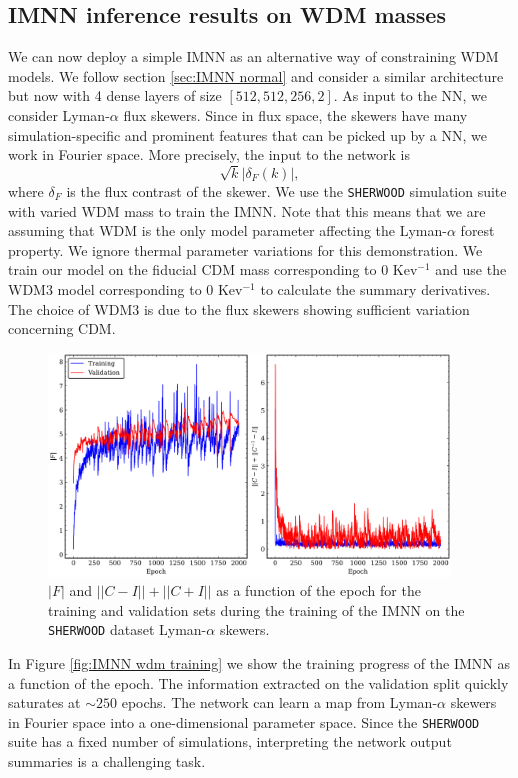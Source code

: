 \subsection{IMNN inference results on WDM masses}\label{sec:IMNN}
We can now deploy a simple IMNN as an alternative way of constraining WDM models. We follow section \ref{sec:IMNN normal} and consider a similar architecture but now with 4 dense layers of size $[512, 512, 256, 2]$. As input to the NN, we consider Lyman-$\alpha$ flux skewers. Since in flux space, the skewers have many simulation-specific and prominent features that can be picked up by a NN, we work in Fourier space. More precisely, the input to the network is 
\begin{equation}
    \sqrt{k} |\delta_F (k)|,
\end{equation}
where $\delta_F$ is the flux contrast of the skewer.
We use the \texttt{SHERWOOD} simulation suite with varied WDM mass to train the IMNN. Note that this means that we are assuming that WDM is the only model parameter affecting the Lyman-$\alpha$ forest property. We ignore thermal parameter variations for this demonstration. We train our model on the fiducial CDM mass corresponding to $0$ Kev$^{-1}$ and use the WDM3 model corresponding to $0$ Kev$^{-1}$ to calculate the summary derivatives. The choice of WDM3 is due to the flux skewers showing sufficient variation concerning CDM.

\begin{figure}
    \centering
    \includegraphics[width=0.95\textwidth]{img/ML/WDM_training_plot.png}
    \caption{$|F|$ and $||C-I ||+||C+I||$ as a function of the epoch for the training and validation sets during the training of the IMNN on the \texttt{SHERWOOD} dataset Lyman-$\alpha$ skewers.}
    \label{fig:IMNN  wdm training}
\end{figure}
In Figure \ref{fig:IMNN wdm training} we show the training progress of the IMNN as a function of the epoch. The information extracted on the validation split quickly saturates at $\sim 250$ epochs. The network can learn a map from Lyman-$\alpha$ skewers in Fourier space into a one-dimensional parameter space. Since the \texttt{SHERWOOD} suite has a fixed number of simulations, interpreting the network output summaries is a challenging task.


